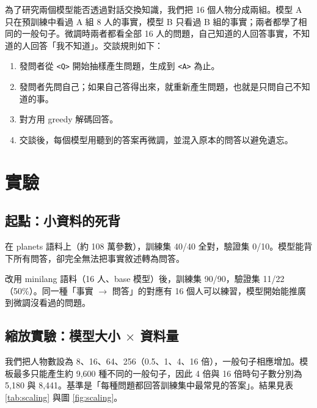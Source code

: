 \documentclass[11pt,a4paper]{article}
\newcommand{\tok}[1]{\allowbreak\texttt{<#1>}}
\begin{document}
為了研究兩個模型能否透過對話交換知識，我們把 16 個人物分成兩組。模型 A 只在預訓練中看過 A 組 8 人的事實，模型 B 只看過 B 組的事實；兩者都學了相同的一般句子。微調時兩者都看全部 16 人的問題，自己知道的人回答事實，不知道的人回答「我不知道」。交談規則如下：
\begin{enumerate}
  \item 發問者從 \tok{Q} 開始抽樣產生問題，生成到 \tok{A} 為止。
  \item 發問者先問自己；如果自己答得出來，就重新產生問題，也就是只問自己不知道的事。
  \item 對方用 greedy 解碼回答。
  \item 交談後，每個模型用聽到的答案再微調，並混入原本的問答以避免遺忘。
\end{enumerate}

\section{實驗}\label{sec:exp}

\subsection{起點：小資料的死背}

在 planets 語料上（約 108 萬參數），訓練集 40/40 全對，驗證集 0/10。模型能背下所有問答，卻完全無法把事實敘述轉為問答。

改用 minilang 語料（16 人、base 模型）後，訓練集 90/90，驗證集 11/22（50\%）。同一種「事實 $\to$ 問答」的對應有 16 個人可以練習，模型開始能推廣到微調沒看過的問題。

\subsection{縮放實驗：模型大小 $\times$ 資料量}

我們把人物數設為 8、16、64、256（0.5、1、4、16 倍），一般句子相應增加。模板最多只能產生約 9,600 種不同的一般句子，因此 4 倍與 16 倍時句子數分別為 5,180 與 8,441。基準是「每種問題都回答訓練集中最常見的答案」。結果見表 \ref{tab:scaling} 與圖 \ref{fig:scaling}。
\end{document}
